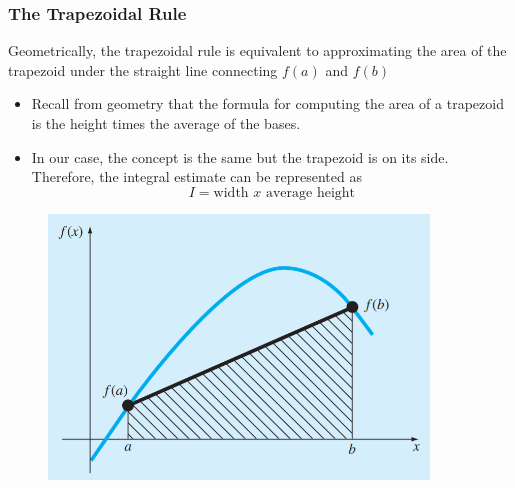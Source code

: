 \documentclass{if-beamer}
\begin{document}
\begin{frame}
	\frametitle{The Trapezoidal Rule}
	Geometrically, the trapezoidal rule is equivalent to approximating the area of the trapezoid under the straight line connecting $f(a)$ and $f(b)$\\\vspace{10pt}
	\begin{minipage}{0.5\textwidth}
		\begin{itemize}
			\item  Recall from geometry
			that the formula for computing the area of a trapezoid is the height times the average of the
			bases. 
			\item  In our case, the concept is the same but the trapezoid is on its side. Therefore, the
			integral estimate can be represented as
			$$I = \textrm{width } x \textrm{ average height}$$
		\end{itemize}
	\end{minipage}
	\begin{minipage}{0.5\textwidth}
		\begin{figure}
			\centering
			\includegraphics[width=0.9\textwidth]{figures/traprule}
		\end{figure}
	\end{minipage}
\end{frame}
\end{document}
